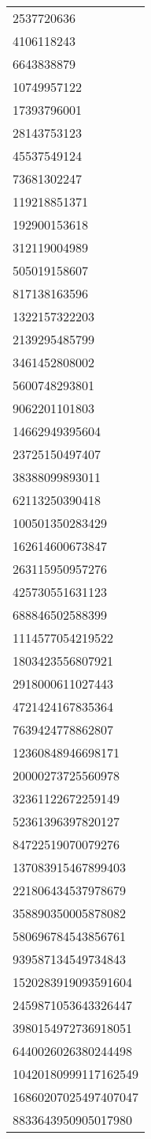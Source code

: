 \begin{longtable}{*{1}{l}}
2537720636\\
4106118243\\
6643838879\\
10749957122\\
17393796001\\
28143753123\\
45537549124\\
73681302247\\
119218851371\\
192900153618\\
312119004989\\
505019158607\\
817138163596\\
1322157322203\\
2139295485799\\
3461452808002\\
5600748293801\\
9062201101803\\
14662949395604\\
23725150497407\\
38388099893011\\
62113250390418\\
100501350283429\\
162614600673847\\
263115950957276\\
425730551631123\\
688846502588399\\
1114577054219522\\
1803423556807921\\
2918000611027443\\
4721424167835364\\
7639424778862807\\
12360848946698171\\
20000273725560978\\
32361122672259149\\
52361396397820127\\
84722519070079276\\
137083915467899403\\
221806434537978679\\
358890350005878082\\
580696784543856761\\
939587134549734843\\
1520283919093591604\\
2459871053643326447\\
3980154972736918051\\
6440026026380244498\\
10420180999117162549\\
16860207025497407047\\
8833643950905017980\\
\bottomrule\end{longtable}
